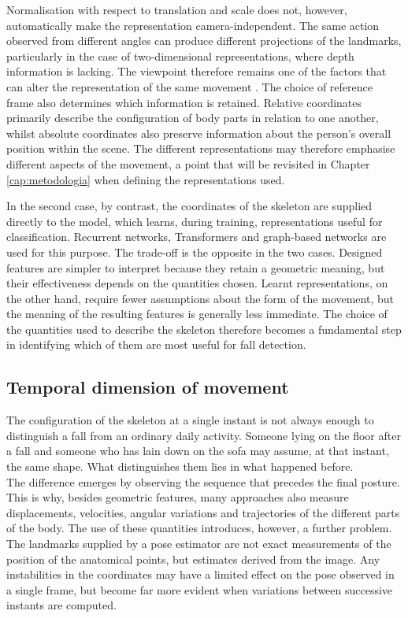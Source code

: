 Normalisation with respect to translation and scale does not, however, automatically make the representation camera-independent. The same action observed from different angles can produce different projections of the landmarks, particularly in the case of two-dimensional representations, where depth information is lacking. The viewpoint therefore remains one of the factors that can alter the representation of the same movement \cite{SK}.
The choice of reference frame also determines which information is retained. Relative coordinates primarily describe the configuration of body parts in relation to one another, whilst absolute coordinates also preserve information about the person's overall position within the scene. The different representations may therefore emphasise different aspects of the movement, a point that will be revisited in Chapter \ref{cap:metodologia} when defining the representations used.

In the second case, by contrast, the coordinates of the skeleton are supplied directly to the model, which learns, during training, representations useful for classification. Recurrent networks, Transformers and graph-based networks are used for this purpose.
The trade-off is the opposite in the two cases. Designed features are simpler to interpret because they retain a geometric meaning, but their effectiveness depends on the quantities chosen. Learnt representations, on the other hand, require fewer assumptions about the form of the movement, but the meaning of the resulting features is generally less immediate.
The choice of the quantities used to describe the skeleton therefore becomes a fundamental step in identifying which of them are most useful for fall detection.

\subsection{Temporal dimension of movement}

The configuration of the skeleton at a single instant is not always enough to distinguish a fall from an ordinary daily activity. Someone lying on the floor after a fall and someone who has lain down on the sofa may assume, at that instant, the same shape. What distinguishes them lies in what happened before.\\
The difference emerges by observing the sequence that precedes the final posture. This is why, besides geometric features, many approaches also measure displacements, velocities, angular variations and trajectories of the different parts of the body. The use of these quantities introduces, however, a further problem. The landmarks supplied by a pose estimator are not exact measurements of the position of the anatomical points, but estimates derived from the image. Any instabilities in the coordinates may have a limited effect on the pose observed in a single frame, but become far more evident when variations between successive instants are computed.

